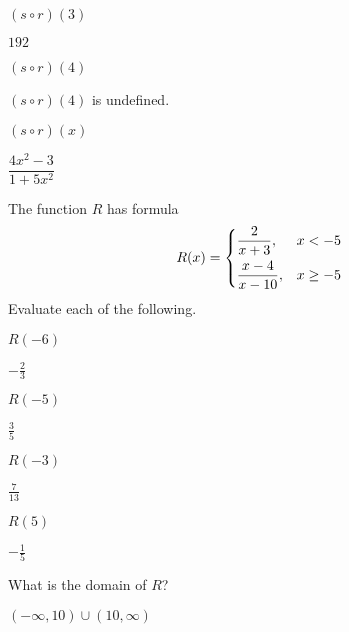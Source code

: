 \begin{exercises}
\begin{problem}[Composition]
\begin{multicols}{3}
\begin{subproblem}
	\end{subproblem}
	\begin{subproblem}
		$(s\circ r)(3)$ 
		\begin{shortsolution}
			$192$ 
		\end{shortsolution}
	\end{subproblem}
	\begin{subproblem}
		$(s\circ r)(4)$ 
		\begin{shortsolution}
			$(s\circ r)(4)$ is undefined.
		\end{shortsolution}
	\end{subproblem}
	\begin{subproblem}
		$(s\circ r)(x)$ 
		\begin{shortsolution}
			$\dfrac{4x^2-3}{1+5x^2}$
		\end{shortsolution}
	\end{subproblem}
\end{multicols}
\end{problem}
\begin{problem}
The function $R$ has formula
\[
	R(x)=
	\begin{dcases}
		\frac{2}{x+3},    & x<-5     \\
		\frac{x-4}{x-10}, & x\geq -5 
	\end{dcases}
\]
Evaluate each of the following.
\begin{multicols}{4}
	\begin{subproblem}
		$R(-6)$    
		\begin{shortsolution}
			$-\frac{2}{3}$ 
		\end{shortsolution}
	\end{subproblem}
	\begin{subproblem}
		$R(-5)$ 
		\begin{shortsolution}
			$\frac{3}{5}$ 
		\end{shortsolution}
	\end{subproblem}
	\begin{subproblem}
		$R(-3)$ 
		\begin{shortsolution}
			$\frac{7}{13}$ 
		\end{shortsolution}
	\end{subproblem}
	\begin{subproblem}
		$R(5)$ 
		\begin{shortsolution}
			$-\frac{1}{5}$ 
		\end{shortsolution}
	\end{subproblem}
\end{multicols}
\begin{subproblem}
	What is the domain of $R$? 
	\begin{shortsolution}
		$(-\infty,10)\cup(10,\infty)$ 
	\end{shortsolution}
\end{subproblem}
\end{problem}
\end{exercises}

